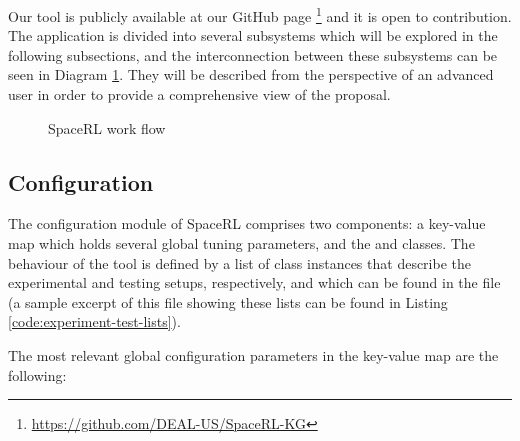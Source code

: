 Our tool is publicly available at our GitHub page \footnote{
    \href{https://github.com/DEAL-US/SpaceRL-KG}{https://github.com/DEAL-US/SpaceRL-KG} 
}
and it is open to contribution. The application is divided into several subsystems which will be explored in the following subsections, and the interconnection between these subsystems can be seen in Diagram \ref{fig:tool_flow}. They will be described from the perspective of an advanced user in order to provide a comprehensive view of the proposal.

\begin{figure}[htp]
    \centering
    
    \caption{SpaceRL work flow}
    \label{fig:tool_flow}
\end{figure}



\subsection{Configuration}\label{sec:framework-config} 

The configuration module of SpaceRL comprises two components: a key-value map which holds several global tuning parameters, and the  and  classes. The behaviour of the tool is defined by a list of class instances that describe the experimental and testing setups, respectively, and which can be found in the  file (a sample excerpt of this file showing these lists can be found in Listing \ref{code:experiment-test-lists}).

The most relevant global configuration parameters in the key-value map are the following:

